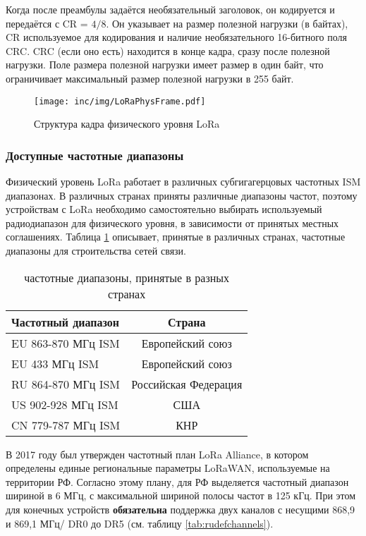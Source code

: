 Когда после преамбулы задаётся необязательный заголовок, он кодируется и передаётся с CR = $4/8$.
Он указывает на размер полезной нагрузки (в байтах), CR используемое для кодирования и наличие необязательного 16-битного поля CRC.
CRC (если оно есть) находится в конце кадра, сразу после полезной нагрузки.
Поле размера полезной нагрузки имеет размер в один байт, что ограничивает максимальный размер полезной нагрузки в 255 байт.

\begin{figure}[!h]
  \centering
  \texttt{[image: inc/img/LoRaPhysFrame.pdf]}
  \caption{Структура кадра физического уровня LoRa}
  \label{fig:loraphysframe}
\end{figure}


\subsubsection{Доступные частотные диапазоны}

Физический уровень LoRa работает в различных субгигагерцовых частотных ISM диапазонах.
В различных странах приняты различные диапазоны частот, поэтому устройствам с LoRa необходимо самостоятельно выбирать используемый радиодиапазон для физического уровня, в зависимости от принятых местных соглашениях. 
Таблица \ref{tab:ismbands} описывает, принятые в различных странах, частотные диапазоны для строительства сетей связи.

\begin{table}[ht]
  \caption{частотные диапазоны, принятые в разных странах}
  \begin{tabular}{|l|c|}
  \hline
	  Частотный диапазон & Страна\\
  \hline
	  EU 863-870 МГц ISM & Европейский союз\\
  \hline
	  EU 433 МГц ISM & Европейский союз\\
  \hline
	  RU 864-870 МГц ISM & Российская Федерация\\
  \hline
	  US 902-928 МГц ISM & США\\
  \hline
	  CN 779-787 МГц ISM & КНР\\
  \hline
  \end{tabular}
  \label{tab:ismbands}
\end{table}

В 2017 году был утвержден частотный план LoRa Alliance, в котором определены единые региональные параметры LoRaWAN, используемые на территории РФ.
Согласно этому плану, для РФ выделяется частотный диапазон шириной в 6 МГц, с максимальной шириной полосы частот в 125 кГц.
При этом для конечных устройств \textbf{обязательна} поддержка двух каналов с несущими 868,9 и 869,1 МГц/ DR0 до DR5 (см. таблицу \ref{tab:rudefchannels}).

